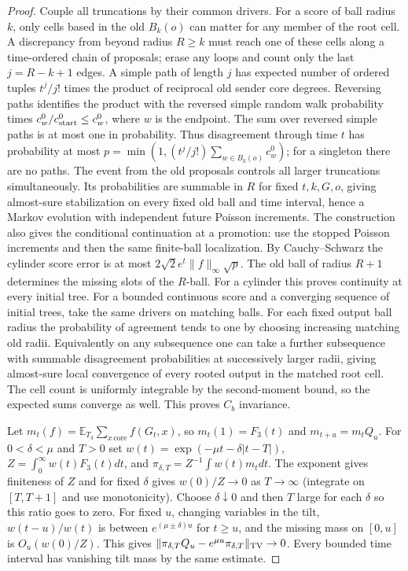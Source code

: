 \documentclass[11pt]{article}
\theoremstyle{remark}
\numberwithin{equation}{section}
\begin{document}
\begin{proof}
Couple all truncations by their common drivers. For a score of ball radius $k$, only cells based in the old $B_k(o)$ can matter for any member of the root cell. A discrepancy from beyond radius $R\ge k$ must reach one of these cells along a time-ordered chain of proposals; erase any loops and count only the last $j=R-k+1$ edges. A simple path of length $j$ has expected number of ordered tuples $t^j/j!$ times the product of reciprocal old sender core degrees. Reversing paths identifies the product with the reversed simple random walk probability times $c_w^0/c_{\rm start}^0\le c_w^0$, where $w$ is the endpoint. The sum over reversed simple paths is at most one in probability. Thus disagreement through time $t$ has probability at most $p=\min(1,(t^j/j!)\sum_{w\in B_k(o)}c_w^0)$; for a singleton there are no paths. The event from the old proposals controls all larger truncations simultaneously. Its probabilities are summable in $R$ for fixed $t,k,G,o$, giving almost-sure stabilization on every fixed old ball and time interval, hence a Markov evolution with independent future Poisson increments. The construction also gives the conditional continuation at a promotion: use the stopped Poisson increments and then the same finite-ball localization. By Cauchy--Schwarz the cylinder score error is at most $2\sqrt{2}e^t\|f\|_\infty\sqrt p$. The old ball of radius $R+1$ determines the missing slots of the $R$-ball. For a cylinder this proves continuity at every initial tree. For a bounded continuous score and a converging sequence of initial trees, take the same drivers on matching balls. For each fixed output ball radius the probability of agreement tends to one by choosing increasing matching old radii. Equivalently on any subsequence one can take a further subsequence with summable disagreement probabilities at successively larger radii, giving almost-sure local convergence of every rooted output in the matched root cell. The cell count is uniformly integrable by the second-moment bound, so the expected sums converge as well. This proves $C_b$ invariance.

Let $m_t(f)=\mathbb E_{T_3}\sum_{x\,\mathrm{core}} f(G_t,x)$, so $m_t(1)=F_3(t)$ and $m_{t+u}=m_tQ_u$. For $0<\delta<\mu$ and $T>0$ set $w(t)=\exp(-\mu t-\delta|t-T|)$, $Z=\int_0^\infty w(t)F_3(t)dt$, and $\pi_{\delta,T}=Z^{-1}\int w(t)m_tdt$. The exponent gives finiteness of $Z$ and for fixed $\delta$ gives $w(0)/Z\to0$ as $T\to\infty$ (integrate on $[T,T+1]$ and use monotonicity). Choose $\delta\downarrow0$ and then $T$ large for each $\delta$ so this ratio goes to zero. For fixed $u$, changing variables in the tilt, $w(t-u)/w(t)$ is between $e^{(\mu\pm\delta)u}$ for $t\ge u$, and the missing mass on $[0,u]$ is $O_u(w(0)/Z)$. This gives $\|\pi_{\delta,T}Q_u-e^{\mu u}\pi_{\delta,T}\|_{\rm TV}\to0$. Every bounded time interval has vanishing tilt mass by the same estimate.


\end{proof}
\end{document}
